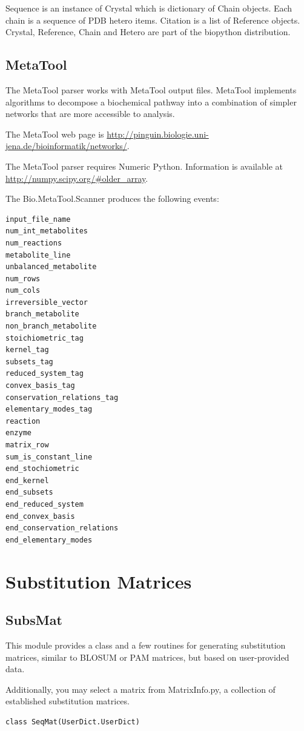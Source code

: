 \documentclass{report}
\begin{document}
Sequence is an instance of Crystal which is dictionary of Chain objects.  Each chain is a sequence of PDB hetero items.  Citation is a list of Reference objects.  Crystal, Reference, Chain and Hetero are part of the biopython distribution.

\subsection{MetaTool}

The MetaTool parser works with MetaTool output files.  MetaTool implements algorithms to decompose a biochemical pathway into a combination of simpler networks that are more accessible to analysis.

The MetaTool web page is \url{http://pinguin.biologie.uni-jena.de/bioinformatik/networks/}.

The MetaTool parser requires Numeric Python. Information is available at
\url{http://numpy.scipy.org/#older_array}.

The Bio.MetaTool.Scanner produces the following events:
\begin{verbatim}
input_file_name
num_int_metabolites
num_reactions
metabolite_line
unbalanced_metabolite
num_rows
num_cols
irreversible_vector
branch_metabolite
non_branch_metabolite
stoichiometric_tag
kernel_tag
subsets_tag
reduced_system_tag
convex_basis_tag
conservation_relations_tag
elementary_modes_tag
reaction
enzyme
matrix_row
sum_is_constant_line
end_stochiometric
end_kernel
end_subsets
end_reduced_system
end_convex_basis
end_conservation_relations
end_elementary_modes
\end{verbatim}

\section{Substitution Matrices}

\subsection{SubsMat}

This module provides a class and a few routines for generating substitution matrices, similar to BLOSUM or PAM matrices, but based on user-provided data.

Additionally, you may select a matrix from MatrixInfo.py, a collection of established substitution matrices.

\begin{verbatim}
class SeqMat(UserDict.UserDict)
\end{verbatim}
\end{document}
